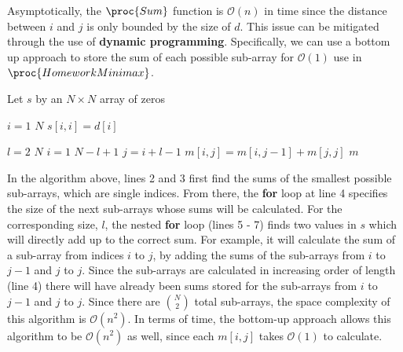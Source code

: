     Asymptotically, the $\proc{Sum}$ function is $\mathcal{O}(n)$ in time since the distance between $i$ and $j$ is only bounded by the size of $d$.
    This issue can be mitigated through the use of \textbf{dynamic programming}.
    Specifically, we can use a bottom up approach to store the sum of each possible sub-array for $\mathcal{O}(1)$ use in $\proc{HomeworkMinimax}$.

    \begin{spacing}{1.2}
        \begin{codebox}
            \li Let $s$ by an $N \times N$ array of zeros

            \li \For $i = 1$ \To $N$
            \Do
                \li $s[i, i] = d[i]$
            \End

            \li \For $l = 2$ \To $N$
            \Do
                \li \For $i = 1$ \To $N - l + 1$
                \Do
                    \li $j = i + l - 1$
                    \li $m[i, j] = m[i, j - 1] + m[j, j]$
                \End
            \End
            \li \Return $m$
        \end{codebox}
    \end{spacing}
    \vspace{5mm}
    In the algorithm above, lines 2 and 3 first find the sums of the smallest possible sub-arrays, which are single indices.
    From there, the \textbf{for} loop at line 4 specifies the size of the next sub-arrays whose sums will be calculated.
    For the corresponding size, $l$, the nested \textbf{for} loop (lines 5 - 7) finds two values in $s$ which will directly add up to the correct sum.
    For example, it will calculate the sum of a sub-array from indices $i$ to $j$, by adding the sums of the sub-arrays from $i$ to $j - 1$ and $j$ to $j$.
    Since the sub-arrays are calculated in increasing order of length (line 4) there will have already been sums stored for the sub-arrays from $i$ to $j - 1$ and $j$ to $j$.
    Since there are $\binom{N}{2}$ total sub-arrays, the space complexity of this algorithm is $\mathcal{O}(n^2)$.
    In terms of time, the bottom-up approach allows this algorithm to be $\mathcal{O}(n^2)$ as well, since each $m[i, j]$ takes $\mathcal{O}(1)$ to calculate.